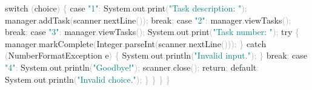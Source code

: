 \documentclass[
  justified,
  openright,
]{tufte-book}
\newcommand{\BuiltInTok}[1]{#1}
\newcommand{\ControlFlowTok}[1]{\textcolor{BrandBlue}{#1}}
\newcommand{\FunctionTok}[1]{\textcolor{BrandBlue}{#1}}
\newcommand{\KeywordTok}[1]{\textcolor{BrandBlue}{#1}}
\newcommand{\NormalTok}[1]{#1}
\newcommand{\OperatorTok}[1]{\textcolor{DarkGray}{#1}}
\newcommand{\StringTok}[1]{\textcolor{Teal}{#1}}
\newenvironment{Shaded}{%
  \begin{snugshade}
}{%
  \end{snugshade}
}
\begin{document}
\begin{Shaded}
\begin{Highlighting}[]
            \ControlFlowTok{switch} \OperatorTok{(}\NormalTok{choice}\OperatorTok{)} \OperatorTok{\{}
                \ControlFlowTok{case} \StringTok{"1"}\OperatorTok{:}
                    \BuiltInTok{System}\OperatorTok{.}\FunctionTok{out}\OperatorTok{.}\FunctionTok{print}\OperatorTok{(}\StringTok{"Task description: "}\OperatorTok{);}
\NormalTok{                    manager}\OperatorTok{.}\FunctionTok{addTask}\OperatorTok{(}\NormalTok{scanner}\OperatorTok{.}\FunctionTok{nextLine}\OperatorTok{());}
                    \ControlFlowTok{break}\OperatorTok{;}
                \ControlFlowTok{case} \StringTok{"2"}\OperatorTok{:}
\NormalTok{                    manager}\OperatorTok{.}\FunctionTok{viewTasks}\OperatorTok{();}
                    \ControlFlowTok{break}\OperatorTok{;}
                \ControlFlowTok{case} \StringTok{"3"}\OperatorTok{:}
\NormalTok{                    manager}\OperatorTok{.}\FunctionTok{viewTasks}\OperatorTok{();}
                    \BuiltInTok{System}\OperatorTok{.}\FunctionTok{out}\OperatorTok{.}\FunctionTok{print}\OperatorTok{(}\StringTok{"Task number: "}\OperatorTok{);}
                    \ControlFlowTok{try} \OperatorTok{\{}
\NormalTok{                        manager}\OperatorTok{.}\FunctionTok{markComplete}\OperatorTok{(}\BuiltInTok{Integer}\OperatorTok{.}\FunctionTok{parseInt}\OperatorTok{(}\NormalTok{scanner}\OperatorTok{.}\FunctionTok{nextLine}\OperatorTok{()));}
                    \OperatorTok{\}} \ControlFlowTok{catch} \OperatorTok{(}\BuiltInTok{NumberFormatException}\NormalTok{ e}\OperatorTok{)} \OperatorTok{\{}
                        \BuiltInTok{System}\OperatorTok{.}\FunctionTok{out}\OperatorTok{.}\FunctionTok{println}\OperatorTok{(}\StringTok{"Invalid input."}\OperatorTok{);}
                    \OperatorTok{\}}
                    \ControlFlowTok{break}\OperatorTok{;}
                \ControlFlowTok{case} \StringTok{"4"}\OperatorTok{:}
                    \BuiltInTok{System}\OperatorTok{.}\FunctionTok{out}\OperatorTok{.}\FunctionTok{println}\OperatorTok{(}\StringTok{"Goodbye!"}\OperatorTok{);}
\NormalTok{                    scanner}\OperatorTok{.}\FunctionTok{close}\OperatorTok{();}
                    \ControlFlowTok{return}\OperatorTok{;}
                \KeywordTok{default}\OperatorTok{:}
                    \BuiltInTok{System}\OperatorTok{.}\FunctionTok{out}\OperatorTok{.}\FunctionTok{println}\OperatorTok{(}\StringTok{"Invalid choice."}\OperatorTok{);}
            \OperatorTok{\}}
        \OperatorTok{\}}
    \OperatorTok{\}}
\OperatorTok{\}}
\end{Highlighting}
\end{Shaded}
\end{document}
